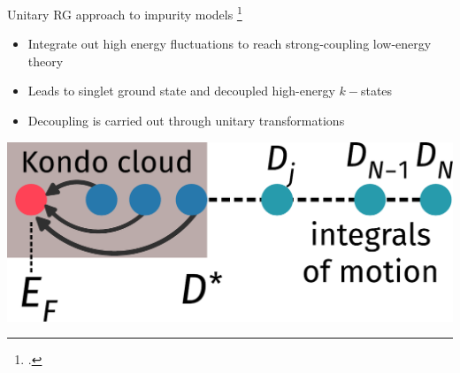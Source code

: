 \documentclass[aspectratio=169]{beamer}
\begin{document}
\begin{frame}{Unitary RG approach to impurity models}
\footcite{anirbanurg1,anirbanurg2}
\begin{minipage}{0.5\textwidth}
\begin{itemize}
	\item Integrate out \alert{high energy fluctuations} to reach strong-coupling low-energy theory\\[10pt]
	\item Leads to \alert{singlet ground state} and decoupled high-energy \(k-\)states\\[10pt]
	\item Decoupling is carried out through \alert{unitary transformations}
\end{itemize}

\end{minipage}
\hspace*{\fill}
\begin{minipage}{0.4\textwidth}
\includegraphics[width=\textwidth]{kondo_fp_1D.pdf}
\end{minipage}
	
\end{frame}
\end{document}
